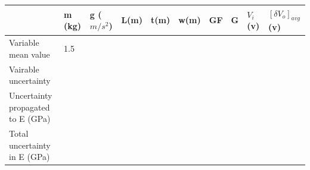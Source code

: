 \documentclass[12pt,a4paper,landscape]{article}
\begin{document}
\begin{table}[!ht]
\vspace{0.2in}
\begin{tabular}{|p{8cm}| p{1.5cm}| p{1.6cm}| p{1.5cm}| p{1.5cm}| p{1.5cm}|p{1.5cm}| p{1.5cm}| p{1.5cm}| p{1.75cm}|}
\toprule \toprule
												& m (kg)   & g ($m/s^2$) & L(m) & t(m) & w(m)& GF & G  & $V_i$ (v) & $[\delta V_o]_{avg}$ (v) \\ \toprule
Variable mean value   							 &     1.5 &             &      &      &     &    &    &           &                \\ \hline
Vairable uncertainty                            &         &             &      &      &     &    &    &           &                \\ \hline
Uncertainty propagated to E (GPa) &         &             &      &      &     &    &    &           &                \\ \bottomrule 
Total uncertainty in E (GPa)      & \multicolumn{8}{c}{}   & \\ \bottomrule \bottomrule             
\end{tabular} 
\end{table}
\end{document}
